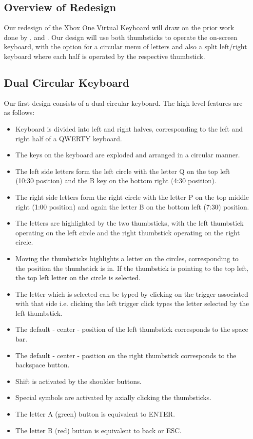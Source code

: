 \documentclass[
	letterpaper, %
]{jdf}
\begin{document}
\subsection{Overview of Redesign}
Our redesign of the Xbox One Virtual Keyboard will draw on the prior work done by \cite{eatsy_taplin_chechik_nelson_2002}, \cite{twostick_2007} and \cite{wilson_agrawala_2006}. Our design will use both thumbsticks to operate the on-screen keyboard, with the option for a circular menu of letters and also a split left/right keyboard where each half is operated by the respective thumbstick.

\subsection{Dual Circular Keyboard}
Our first design consists of a dual-circular keyboard. The high level features are as follows:
\begin{itemize}
    \item Keyboard is divided into left and right halves, corresponding to the left and right half of a QWERTY keyboard.
    \item The keys on the keyboard are exploded and arranged in a circular manner.
    \item The left side letters form the left circle with the letter Q on the top left (10:30 position) and the B key on the bottom right (4:30 position).
    \item The right side letters form the right circle with the letter P on the top middle right (1:00 position) and again the letter B on the bottom left (7:30) position.
    \item The letters are highlighted by the two thumbsticks, with the left thumbstick operating on the left circle and the right thumbstick operating on the right circle.
    \item Moving the thumbsticks highlights a letter on the circles, corresponding to the position the thumbstick is in. If the thumbstick is pointing to the top left, the top left letter on the circle is selected.
    \item The letter which is selected can be typed by clicking on the trigger associated with that side i.e. clicking the left trigger click types the letter selected by the left thumbstick.
    \item The default - center - position of the left thumbstick corresponds to the space bar.
    \item The default - center - position on the right thumbstick corresponds to the backspace button.
    \item Shift is activated by the shoulder buttons.
    \item Special symbols are activated by axially clicking the thumbsticks.
    \item The letter A (green) button is equivalent to ENTER.
    \item The letter B (red) button is equivalent to back or ESC.
\end{itemize}
\end{document}
